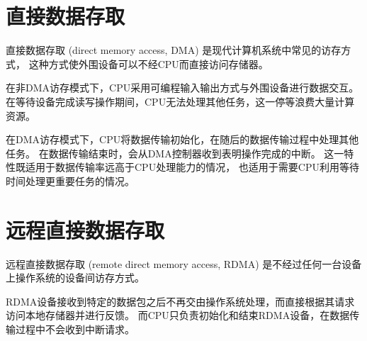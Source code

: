 \section{直接数据存取}
直接数据存取 (direct memory access, DMA) 是现代计算机系统中常见的访存方式，
这种方式使外围设备可以不经CPU而直接访问存储器。

在非DMA访存模式下，CPU采用可编程输入输出方式与外围设备进行数据交互。
在等待设备完成读写操作期间，CPU无法处理其他任务，这一停等浪费大量计算资源。

在DMA访存模式下，CPU将数据传输初始化，在随后的数据传输过程中处理其他任务。
在数据传输结束时，会从DMA控制器收到表明操作完成的中断。
这一特性既适用于数据传输率远高于CPU处理能力的情况，
也适用于需要CPU利用等待时间处理更重要任务的情况。

\section{远程直接数据存取}
远程直接数据存取 (remote direct memory access, RDMA) 是不经过任何一台设备上操作系统的设备间访存方式。

RDMA设备接收到特定的数据包之后不再交由操作系统处理，而直接根据其请求访问本地存储器并进行反馈。
而CPU只负责初始化和结束RDMA设备，在数据传输过程中不会收到中断请求。
